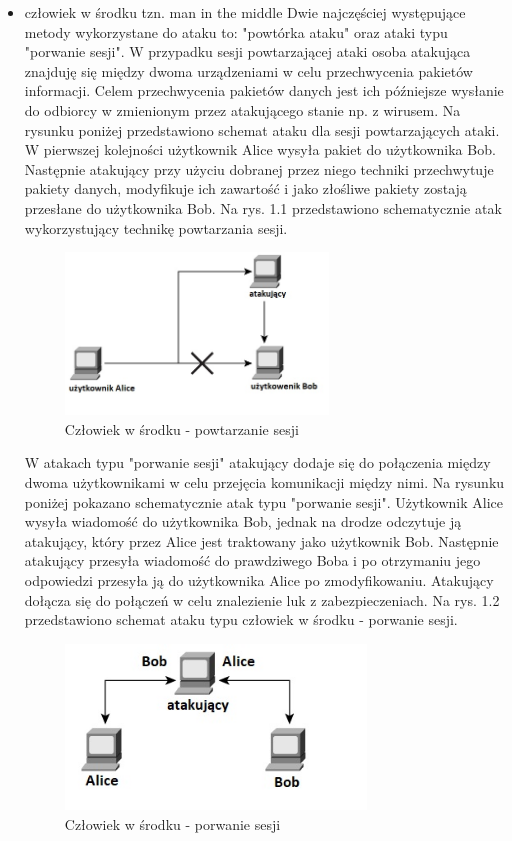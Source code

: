 \documentclass[12p]{article}
\begin{document}
\begin{itemize}
\item człowiek w środku tzn. man in the middle
\newline Dwie najczęściej występujące metody wykorzystane do ataku to: "powtórka ataku" oraz ataki typu "porwanie sesji". W przypadku sesji powtarzającej ataki osoba atakująca znajduję się między dwoma urządzeniami w celu przechwycenia pakietów informacji. Celem przechwycenia pakietów danych jest ich późniejsze wysłanie do odbiorcy w zmienionym przez atakującego stanie np. z wirusem. Na rysunku poniżej przedstawiono schemat ataku dla sesji powtarzających ataki. W pierwszej kolejności użytkownik Alice wysyła pakiet do użytkownika Bob. Następnie atakujący przy użyciu dobranej przez niego techniki przechwytuje pakiety danych, modyfikuje ich zawartość i jako złośliwe pakiety zostają przesłane do użytkownika Bob. Na rys. 1.1 przedstawiono schematycznie atak wykorzystujący technikę powtarzania sesji.
\begin{figure}[h]
\centering
\includegraphics[width=7cm]{Powtarzajace_ataki.jpg}
\caption{Człowiek w środku - powtarzanie sesji}
\end{figure}

\quad W atakach typu "porwanie sesji" atakujący dodaje się do połączenia między dwoma użytkownikami w celu przejęcia komunikacji między nimi. Na rysunku poniżej pokazano schematycznie atak typu "porwanie sesji". Użytkownik Alice wysyła wiadomość do użytkownika Bob, jednak na drodze odczytuje ją atakujący, który przez Alice jest traktowany jako użytkownik Bob. Następnie atakujący przesyła wiadomość do prawdziwego Boba i po otrzymaniu jego odpowiedzi przesyła ją do użytkownika Alice po zmodyfikowaniu. Atakujący dołącza się do połączeń w celu znalezienie luk z zabezpieczeniach. Na rys. 1.2 przedstawiono schemat ataku typu człowiek w środku - porwanie sesji.
\begin{figure}[h]
\centering
\includegraphics[width=8cm]{Porwanie_sesji.jpg}
\caption{Człowiek w środku - porwanie sesji}
\end{figure}


\end{itemize}
\end{document}
